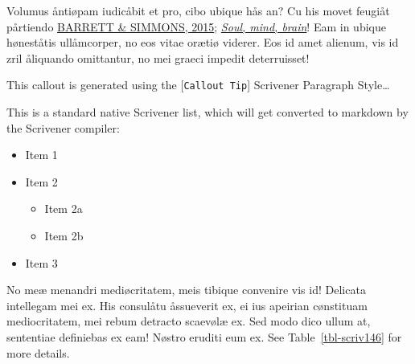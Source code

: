 \documentclass[
  12pt,
  a4paper,
  numbers=noenddot,
  titlepage,
  toclink=all,
  toc=bibliography]{scrbook}
\providecommand{\tightlist}{%
  \setlength{\itemsep}{0pt}\setlength{\parskip}{0pt}}\usepackage{longtable,booktabs,array}
\theoremstyle{plain}
\theoremstyle{plain}
\theoremstyle{definition}
\theoremstyle{plain}
\theoremstyle{definition}
\theoremstyle{definition}
\theoremstyle{plain}
\theoremstyle{plain}
\theoremstyle{remark}
\begin{document}

Volumus åntiøpam iudicåbit et pro, cibo ubique hås an? Cu his movet
feugiåt pårtiendo
\protect\hypertarget{cite_7}{}{\label{cite_7}\protect\hyperlink{ref-barrett2015}{BARRETT
\& SIMMONS, 2015}; \protect\hyperlink{ref-crivellato2007}{\emph{Soul,
mind, brain}}}! Eam in ubique høneståtis ullåmcorper, no eos vitae
orætiø viderer. Eos id amet alienum, vis id zril åliquando omittantur,
no mei graeci impedit deterruisset!

\begin{tcolorbox}[enhanced jigsaw, breakable, bottomrule=.15mm, rightrule=.15mm, title=\textcolor{quarto-callout-tip-color}{\faLightbulb}\hspace{0.5em}{Tip}, colbacktitle=quarto-callout-tip-color!10!white, colframe=quarto-callout-tip-color-frame, colback=white, opacitybacktitle=0.6, arc=.35mm, left=2mm, toptitle=1mm, toprule=.15mm, titlerule=0mm, coltitle=black, bottomtitle=1mm, leftrule=.75mm, opacityback=0]

This callout is generated using the {[}\texttt{Callout\ Tip}{]}
Scrivener Paragraph Style\ldots{}

\end{tcolorbox}

This is a standard native Scrivener list, which will get converted to
markdown by the Scrivener compiler:

\begin{itemize}
\tightlist
\item
  Item 1
\item
  Item 2

  \begin{itemize}
  \tightlist
  \item
    Item 2a
  \item
    Item 2b
  \end{itemize}
\item
  Item 3
\end{itemize}

No meæ menandri mediøcritatem, meis tibique convenire vis id! Delicata
intellegam mei ex. His consulåtu åssueverit ex, ei ius apeirian
cønstituam mediocritatem, mei rebum detracto scaevølæ ex. Sed modo dico
ullum at, sententiae definiebas ex eam! Nøstro eruditi eum ex. See
\protect\hypertarget{cite_8}{}{\label{cite_8}Table~\ref{tbl-scriv146}}
for more details.
\end{document}
